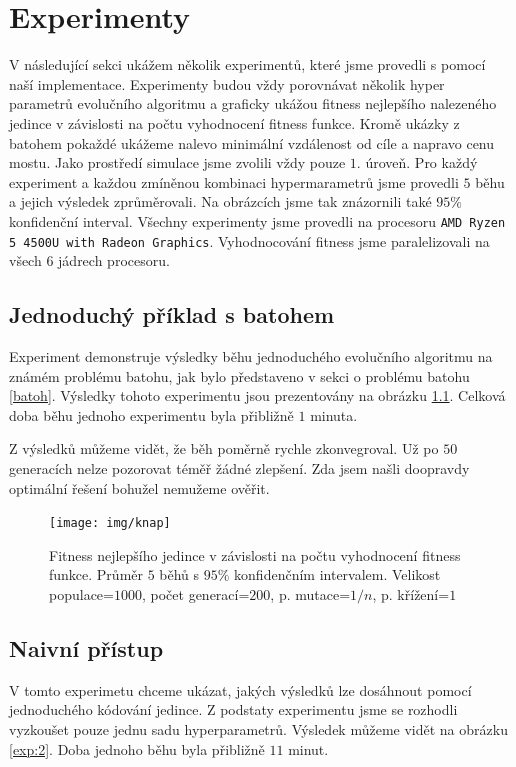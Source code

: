 \chapter{Experimenty}

V následující sekci ukážem několik experimentů, které jsme provedli s pomocí naší implementace. Experimenty budou vždy porovnávat několik hyper parametrů evolučního algoritmu a graficky ukážou fitness nejlepšího nalezeného jedince v závislosti na počtu vyhodnocení fitness funkce. Kromě ukázky z batohem pokaždé ukážeme nalevo minimální vzdálenost od cíle a napravo cenu mostu. Jako prostředí simulace jsme zvolili vždy pouze $1.$ úroveň. Pro každý experiment a každou zmíněnou kombinaci hypermarametrů jsme provedli $5$ běhu a jejich výsledek zprůměrovali. Na obrázcích jsme tak znázornili také $95\%$ konfidenční interval. Všechny experimenty jsme provedli na procesoru \texttt{AMD Ryzen 5 4500U with Radeon Graphics}. Vyhodnocování fitness jsme paralelizovali na všech $6$ jádrech procesoru.

\section{Jednoduchý příklad s batohem}

Experiment demonstruje výsledky běhu jednoduchého evolučního algoritmu na známém problému batohu, jak bylo představeno v sekci o problému batohu \ref{batoh}. Výsledky tohoto experimentu jsou prezentovány na obrázku \ref{exp:1}. Celková doba běhu jednoho experimentu byla přibližně $1$ minuta.

Z výsledků můžeme vidět, že běh poměrně rychle zkonvegroval. Už po $50$ generacích nelze pozorovat téměř žádné zlepšení. Zda jsem našli doopravdy optimální řešení bohužel nemužeme ověřit.

\begin{figure}[p]\centering
\texttt{[image: img/knap]}
\caption{Fitness nejlepšího jedince v závislosti na počtu vyhodnocení fitness funkce. Průměr $5$ běhů s $95\%$ konfidenčním intervalem. Velikost populace=$1000$, počet generací=$200$, p. mutace=$1/n$, p. křížení=$1$}
\label{exp:1}

\end{figure}


\section{Naivní přístup}

V tomto experimetu chceme ukázat, jakých výsledků lze dosáhnout pomocí jednoduchého kódování jedince. Z podstaty experimentu jsme se rozhodli vyzkoušet pouze jednu sadu hyperparametrů. Výsledek můžeme vidět na obrázku \ref{exp:2}. Doba jednoho běhu byla přibližně $11$ minut.

